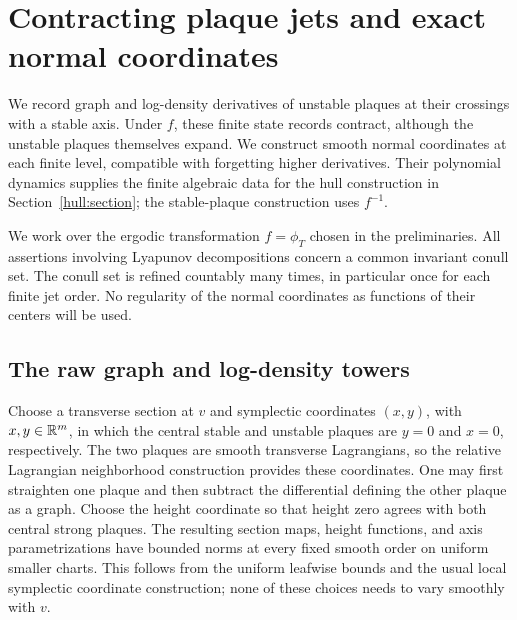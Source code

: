 \section{Contracting plaque jets and exact normal coordinates}
\label{nf:section}

We record graph and log-density derivatives of unstable plaques
at their crossings with a stable axis. Under $f$, these finite
state records contract, although the unstable plaques themselves
expand. We construct smooth normal coordinates at each finite level,
compatible with forgetting higher derivatives. Their polynomial
dynamics supplies the finite algebraic data for the hull construction
in Section~\ref{hull:section}; the stable-plaque construction uses $f^{-1}$.

We work over the ergodic transformation $f=\phi_T$ chosen in the
preliminaries.  All assertions involving Lyapunov decompositions concern
a common invariant conull set.  The conull set is refined countably many
times, in particular once for each finite jet order.  No regularity of
the normal coordinates as functions of their centers will be used.

\subsection{The raw graph and log-density towers}

Choose a transverse section at $v$ and symplectic coordinates $(x,y)$,
with $x,y\in\mathbb R^m$, in which the central stable and unstable plaques
are $y=0$ and $x=0$, respectively.  The two plaques are smooth
transverse Lagrangians, so the relative Lagrangian neighborhood
construction provides these coordinates.  One may first straighten
one plaque and then subtract the differential defining the other
plaque as a graph.  Choose the height coordinate so that height zero
agrees with both central strong plaques.  The resulting section
maps, height functions, and axis parametrizations have bounded norms
at every fixed smooth order on uniform smaller charts.  This follows
from the uniform leafwise bounds and the usual local symplectic
coordinate construction; none of these choices needs to vary
smoothly with $v$.

